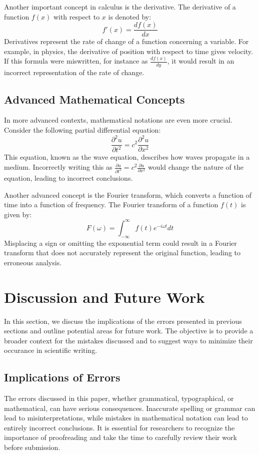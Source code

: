 \documentclass{article}
\begin{document}
Another important concept in calculus is the derivative. The derivative of a function $f(x)$ with respect to $x$ is denoted by:
\begin{equation}
    f'(x) = \frac{df(x)}{dx}
\end{equation}
Derivatives represent the rate of change of a function concerning a variable. For example, in physics, the derivative of position with respect to time gives velocity. If this formula were miswritten, for instance as $\frac{df(x)}{dy}$, it would result in an incorrect representation of the rate of change.

\subsection{Advanced Mathematical Concepts}
In more advanced contexts, mathematical notations are even more crucial. Consider the following partial differential equation:
\begin{equation}
    \frac{\partial^2 u}{\partial t^2} = c^2 \frac{\partial^2 u}{\partial x^2}
\end{equation}
This equation, known as the wave equation, describes how waves propagate in a medium. Incorrectly writing this as $\frac{\partial u}{\partial t^2} = c^2 \frac{\partial u}{\partial x^2}$ would change the nature of the equation, leading to incorrect conclusions.

Another advanced concept is the Fourier transform, which converts a function of time into a function of frequency. The Fourier transform of a function $f(t)$ is given by:
\begin{equation}
    F(\omega) = \int_{-\infty}^{\infty} f(t) e^{-i\omega t} dt
\end{equation}
Misplacing a sign or omitting the exponential term could result in a Fourier transform that does not accurately represent the original function, leading to erroneous analysis.

\section{Discussion and Future Work}
In this section, we discuss the implications of the errors presented in previous sections and outline potential areas for future work. The objective is to provide a broader context for the mistakes discussed and to suggest ways to minimize their occurance in scientific writing.

\subsection{Implications of Errors}
The errors discussed in this paper, whether grammatical, typographical, or mathematical, can have serious consequences. Inaccurate spelling or grammar can lead to misinterpretations, while mistakes in mathematical notation can lead to entirely incorrect conclusions. It is essential for researchers to recognize the importance of proofreading and take the time to carefully review their work before submission.
\end{document}
